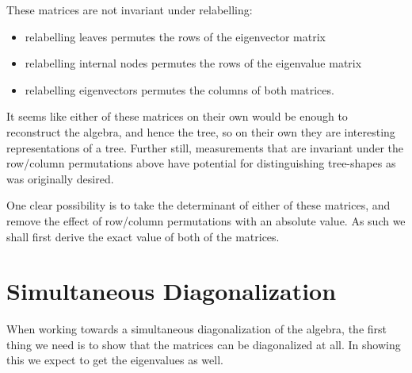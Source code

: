 \documentclass{article}
\begin{document}
These matrices are not invariant under relabelling:
\begin{itemize}
	\item relabelling leaves permutes the rows of the eigenvector matrix
	\item relabelling internal nodes permutes the rows of the eigenvalue matrix
	\item relabelling eigenvectors permutes the columns of both matrices.
\end{itemize}

It seems like either of these matrices on their own would be enough to
reconstruct the algebra, and hence the tree, so on their own they are
interesting representations of a tree.
Further still, measurements that are invariant under the row/column
permutations above have potential for distinguishing tree-shapes as was
originally desired.

One clear possibility is to take the determinant of either of these matrices,
and remove the effect of row/column permutations with an absolute value.
As such we shall first derive the exact value of both of the matrices.


\section{Simultaneous Diagonalization}

%
%
%
%

When working towards a simultaneous diagonalization of the algebra, the first
thing we need is to show that the matrices can be diagonalized at all.
In showing this we expect to get the eigenvalues as well.
\end{document}
